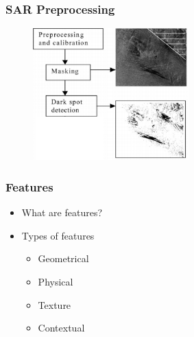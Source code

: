 \documentclass{beamer}
\begin{document}

\begin{frame}
\frametitle{SAR Preprocessing}

	\begin{figure}
		\centering
    	\includegraphics[width=60mm,scale=1]{./img/preprocessing_diagram.png}
	\end{figure}
	
\end{frame}


\begin{frame}
\frametitle{Features}

	\begin{itemize}
		\item What are features?
		\item Types of features 
			\begin{itemize}
				\item Geometrical 
				\item Physical 
				\item Texture 
				\item Contextual  
			\end{itemize}	
	\end{itemize}

\end{frame}

\end{document}
